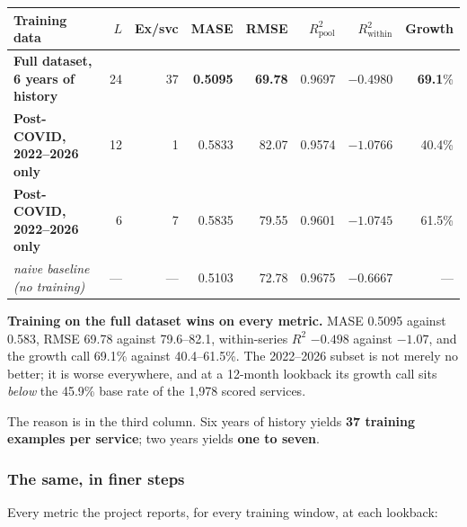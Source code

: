 \documentclass[11pt,a4paper]{article}
\newcommand{\keypoint}[1]{%
  \par\vspace{0.4em}%
  \noindent\colorbox{fed!8}{\parbox{0.98\textwidth}{\vspace{0.2em}#1\vspace{0.2em}}}%
  \par\vspace{0.4em}}
\begin{document}
\begin{center}
\footnotesize
\begin{tabular}{@{}lrrrrrrr@{}}
\toprule
\textbf{Training data} & \textbf{$L$} & \textbf{Ex/svc} & \textbf{MASE} & \textbf{RMSE} & \textbf{$R^2_{\text{pool}}$} & \textbf{$R^2_{\text{within}}$} & \textbf{Growth} \\
\midrule
\textbf{Full dataset, 6 years of history} & 24 & 37 & \textbf{0.5095} & \textbf{69.78} & 0.9697 & $-0.4980$ & \textbf{69.1}\% \\
\textbf{Post-COVID, 2022--2026 only} & 12 & 1 & 0.5833 & 82.07 & 0.9574 & $-1.0766$ & 40.4\% \\
\textbf{Post-COVID, 2022--2026 only} & 6 & 7 & 0.5835 & 79.55 & 0.9601 & $-1.0745$ & 61.5\% \\
\midrule
\textit{naive baseline (no training)} & --- & --- & 0.5103 & 72.78 & 0.9675 & $-0.6667$ & --- \\
\bottomrule
\end{tabular}
\end{center}

\keypoint{\textbf{Training on the full dataset wins on every metric.} MASE 0.5095 against 0.583, RMSE
69.78 against 79.6--82.1, within-series $R^2$ $-0.498$ against $-1.07$, and the growth call 69.1\%
against 40.4--61.5\%. The 2022--2026 subset is not merely no better; it is worse everywhere, and at a
12-month lookback its growth call sits \emph{below} the 45.9\% base rate of the 1{,}978 scored
services.

The reason is in the third column. Six years of history yields \textbf{37 training examples per
service}; two years yields \textbf{one to seven}.}

\subsubsection*{The same, in finer steps}

Every metric the project reports, for every training window, at each lookback:
\end{document}
